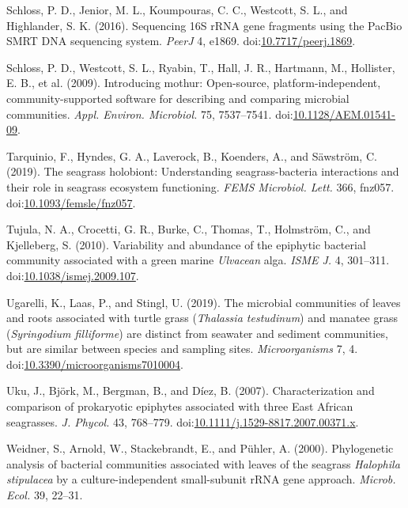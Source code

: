 \documentclass[12pt,]{article}
\begin{document}
\leavevmode\hypertarget{ref-Schloss2016}{}%
Schloss, P. D., Jenior, M. L., Koumpouras, C. C., Westcott, S. L., and
Highlander, S. K. (2016). Sequencing 16S rRNA gene fragments using the
PacBio SMRT DNA sequencing system. \emph{PeerJ} 4, e1869.
doi:\href{https://doi.org/10.7717/peerj.1869}{10.7717/peerj.1869}.

\leavevmode\hypertarget{ref-Schloss2009}{}%
Schloss, P. D., Westcott, S. L., Ryabin, T., Hall, J. R., Hartmann, M.,
Hollister, E. B., et al. (2009). Introducing mothur: Open-source,
platform-independent, community-supported software for describing and
comparing microbial communities. \emph{Appl. Environ. Microbiol.} 75,
7537--7541.
doi:\href{https://doi.org/10.1128/AEM.01541-09}{10.1128/AEM.01541-09}.

\leavevmode\hypertarget{ref-Tarquinio2019}{}%
Tarquinio, F., Hyndes, G. A., Laverock, B., Koenders, A., and Säwström,
C. (2019). The seagrass holobiont: Understanding seagrass-bacteria
interactions and their role in seagrass ecosystem functioning.
\emph{FEMS Microbiol. Lett.} 366, fnz057.
doi:\href{https://doi.org/10.1093/femsle/fnz057}{10.1093/femsle/fnz057}.

\leavevmode\hypertarget{ref-Tujula2010}{}%
Tujula, N. A., Crocetti, G. R., Burke, C., Thomas, T., Holmström, C.,
and Kjelleberg, S. (2010). Variability and abundance of the epiphytic
bacterial community associated with a green marine \emph{Ulvacean} alga.
\emph{ISME J.} 4, 301--311.
doi:\href{https://doi.org/10.1038/ismej.2009.107}{10.1038/ismej.2009.107}.

\leavevmode\hypertarget{ref-Ugarelli2019}{}%
Ugarelli, K., Laas, P., and Stingl, U. (2019). The microbial communities
of leaves and roots associated with turtle grass (\emph{Thalassia
testudinum}) and manatee grass (\emph{Syringodium filliforme}) are
distinct from seawater and sediment communities, but are similar between
species and sampling sites. \emph{Microorganisms} 7, 4.
doi:\href{https://doi.org/10.3390/microorganisms7010004}{10.3390/microorganisms7010004}.

\leavevmode\hypertarget{ref-Uku2007}{}%
Uku, J., Björk, M., Bergman, B., and Díez, B. (2007). Characterization
and comparison of prokaryotic epiphytes associated with three East
African seagrasses. \emph{J. Phycol.} 43, 768--779.
doi:\href{https://doi.org/10.1111/j.1529-8817.2007.00371.x}{10.1111/j.1529-8817.2007.00371.x}.

\leavevmode\hypertarget{ref-Weidner2000}{}%
Weidner, S., Arnold, W., Stackebrandt, E., and Pühler, A. (2000).
Phylogenetic analysis of bacterial communities associated with leaves of
the seagrass \emph{Halophila stipulacea} by a culture-independent
small-subunit rRNA gene approach. \emph{Microb. Ecol.} 39, 22--31.
\end{document}
